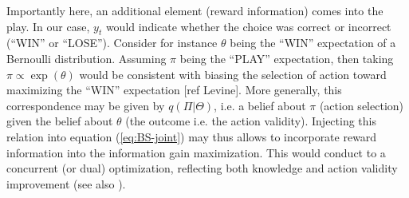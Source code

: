 \documentclass[10pt,letterpaper]{article}
\begin{document}
{Importantly here,  an additional element (reward information) comes into the play. In our case,  $y_t$ would indicate whether the choice was correct or incorrect (``WIN'' or ``LOSE''). %
Consider for instance $\theta$ being the ``WIN'' expectation of a Bernoulli distribution. Assuming $\pi$ being the ``PLAY'' expectation, then taking $\pi \propto\exp(\theta)$ would be consistent with biasing the selection of action toward maximizing the ``WIN'' expectation [ref Levine]. More generally, %
this correspondence may be given by $q(\Pi|\Theta)$, i.e. a belief about $\pi$ (action selection) given the belief about $\theta$ (the outcome i.e. the action validity). Injecting this relation into equation (\ref{eq:BS-joint}) may thus allows to incorporate reward information into the information gain maximization. This would conduct to a concurrent (or dual) optimization, reflecting both knowledge and action validity improvement (see also \cite{dauce2022concurrent}).




} 
\end{document}
